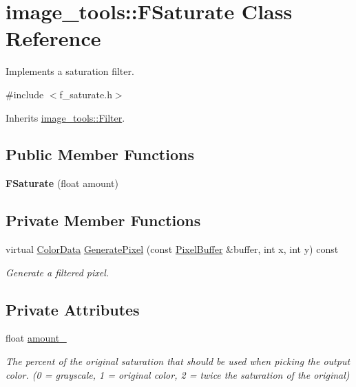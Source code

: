 \hypertarget{classimage__tools_1_1FSaturate}{}\section{image\+\_\+tools\+:\+:F\+Saturate Class Reference}
\label{classimage__tools_1_1FSaturate}


Implements a saturation filter.  




{\ttfamily \#include $<$f\+\_\+saturate.\+h$>$}



Inherits \hyperlink{classimage__tools_1_1Filter}{image\+\_\+tools\+::\+Filter}.

\subsection*{Public Member Functions}
\begin{DoxyCompactItemize}
\item 
{\bfseries F\+Saturate} (float amount)\hypertarget{classimage__tools_1_1FSaturate_a5940def93bf1851091ae93e949a34b7d}{}\label{classimage__tools_1_1FSaturate_a5940def93bf1851091ae93e949a34b7d}

\end{DoxyCompactItemize}
\subsection*{Private Member Functions}
\begin{DoxyCompactItemize}
\item 
virtual \hyperlink{classimage__tools_1_1ColorData}{Color\+Data} \hyperlink{classimage__tools_1_1FSaturate_af576256575784ecbdf39109a0131e819}{Generate\+Pixel} (const \hyperlink{classimage__tools_1_1PixelBuffer}{Pixel\+Buffer} \&buffer, int x, int y) const 
\begin{DoxyCompactList}\small\item\em Generate a filtered pixel. \end{DoxyCompactList}\end{DoxyCompactItemize}
\subsection*{Private Attributes}
\begin{DoxyCompactItemize}
\item 
float \hyperlink{classimage__tools_1_1FSaturate_a76f7563fdee11d37e3ac640ced26bdd6}{amount\+\_\+}\hypertarget{classimage__tools_1_1FSaturate_a76f7563fdee11d37e3ac640ced26bdd6}{}\label{classimage__tools_1_1FSaturate_a76f7563fdee11d37e3ac640ced26bdd6}

\begin{DoxyCompactList}\small\item\em The percent of the original saturation that should be used when picking the output color. (0 = grayscale, 1 = original color, 2 = twice the saturation of the original) \end{DoxyCompactList}\end{DoxyCompactItemize}


